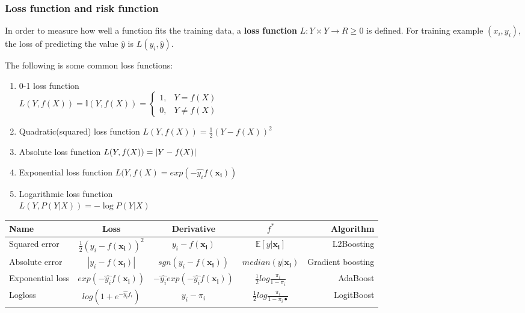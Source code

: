 \subsubsection{Loss function and risk function}
\label{sec:Loss-function-and-risk-function}

\begin{definition}
In order to measure how well a function fits the training data, a \textbf{loss function} $L:Y \times Y \rightarrow R \geq 0$ is defined. For training example $(x_i,y_i)$, the loss of predicting the value $\widehat{y}$ is $L(y_i,\widehat{y})$.
\end{definition}

The following is some common loss functions:
\begin{enumerate}
\item 0-1 loss function \\ $L(Y,f(X))=\mathbb{I}(Y,f(X))=\begin{cases} 1, & Y=f(X) \\ 0, & Y \neq f(X) \end{cases}$
\item Quadratic(squared) loss function $L(Y,f(X))=\frac{1}{2}\left(Y-f(X)\right)^2$
\item Absolute loss function $L(Y,f(X))=\left\lvert Y-f(X)\right\rvert$
\item Exponential loss function $L(Y,f(X)=exp(-\hat{y_i}f(\mathbf{x_i}))$ 
\item Logarithmic loss function \\ $L(Y,P(Y|X))=-\log{P(Y|X)}$
\end{enumerate}

\begin{tabular}{l*{3}{c}r}
Name & Loss & Derivative & $f^*$ & Algorithm                                                                                 \\
\hline
Squared error & $\frac{1}{2}(y_i-f(\mathbf{x_i}))^2$ & $y_i - f(\mathbf{x_i})$ & $\mathbb{E}[y|\mathbf{x_i}]$ & L2Boosting \\
Absolute error & $|y_i-f(\mathbf{x_i})|$ & $sgn(y_i-f(\mathbf{x_i}))$ & $median(y|\mathbf{x_i})$ & Gradient boosting \\
Exponential loss & $exp(-\hat{y_i}f(\mathbf{x_i}))$ & $-\hat{y_i}exp(-\hat{y_i}f(\mathbf{x_i}))$ & $\frac{1}{2}log\frac{\pi_i}{1-\pi_i}$ & AdaBoost \\
Logloss & $log(1+e^{-\hat{y_i}f_i})$ & $y_i-\pi_i$ & $\frac{1}{2}log\frac{\pi_i}{1-\pi_i•}$ & LogitBoost
\end{tabular}

